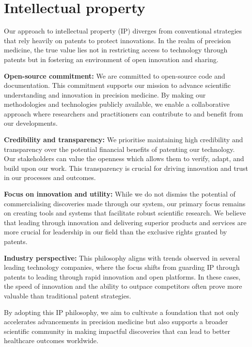 \section{Intellectual property}

Our approach to intellectual property (IP) diverges from conventional strategies that rely heavily on patents to protect innovations. 
In the realm of precision medicine, the true value lies not in restricting access to technology through patents but in fostering an environment of open innovation and sharing. 

\textbf{Open-source commitment:} We are committed to open-source code and documentation. This commitment supports our mission to advance scientific understanding and innovation in precision medicine. By making our methodologies and technologies publicly available, we enable a collaborative approach where researchers and practitioners can contribute to and benefit from our developments.

\textbf{Credibility and transparency:} We prioritise maintaining high credibility and transparency over the potential financial benefits of patenting our technology. Our stakeholders can value the openness which allows them to verify, adapt, and build upon our work. This transparency is crucial for driving innovation and trust in our processes and outcomes.

\textbf{Focus on innovation and utility:} While we do not dismiss the potential of commercialising discoveries made through our system, our primary focus remains on creating tools and systems that facilitate robust scientific research. We believe that leading through innovation and delivering superior products and services are more crucial for leadership in our field than the exclusive rights granted by patents.

\textbf{Industry perspective:} This philosophy aligns with trends observed in several leading technology companies, where the focus shifts from guarding IP through patents to leading through rapid innovation and open platforms. In these cases, the speed of innovation and the ability to outpace competitors often prove more valuable than traditional patent strategies.

By adopting this IP philosophy, we aim to cultivate a foundation that not only accelerates advancements in precision medicine but also supports a broader scientific community in making impactful discoveries that can lead to better healthcare outcomes worldwide.
